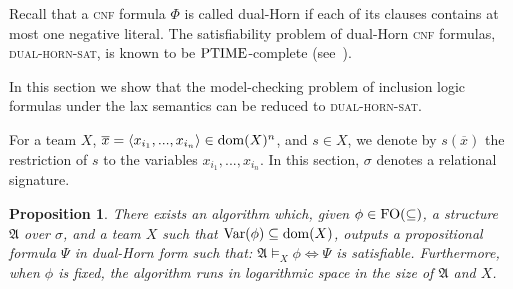 \documentclass{article}
\theoremstyle{plain}
\newtheorem{proposition}[theorem]{Proposition}
\theoremstyle{definition}
\newcommand{\sg}{\sigma}
\newcommand{\mA}{{\mathfrak A}}
\newcommand{\dom}{{\rm dom}}
\newcommand{\restrict}[2]{{#1}({#2})}
\newcommand{\Var}{{\rm Var}}
\newcommand{\FOinclusion}{{\rm FO(\subseteq)}}
\newcommand{\Ptime}{{\rm PTIME}}
\newcommand{\tu}[1]{\overline{#1}}
\newcommand{\pb}[1]{\textsc{#1}}
\begin{document}
Recall that a \pb{cnf} formula $\Phi$ is called dual-Horn if each of its clauses contains at most one negative literal. The satisfiability problem of dual-Horn \pb{cnf} formulas, \pb{dual-horn-sat}, is known to be $\Ptime$-complete (see~\cite{GareyJ1979}).  

 In this section we show that the model-checking problem of inclusion logic formulas under the lax semantics  can be reduced to \pb{dual-horn-sat}.
  
For a team $X$, $\tu x= \langle x_{i_1},...,x_{i_n}\rangle \in \dom(X)^n$, and $s\in X$, we denote by $\restrict{s}{\tu x}$ the restriction of $s$ to the  variables $x_{i_1},...,x_{i_n}$. In this section, $\sg$ denotes a relational signature.

  \begin{proposition}\label{FO inclusion lax}
  There exists an algorithm which, given 
   $\phi\in\FOinclusion$,  a structure $\mA$ over $\sigma$, and  a team $X$ such that $\Var({\phi})\subseteq \dom(X)$, outputs a propositional formula $\Psi$ in dual-Horn form such that: $\mA \models_X \phi \iff  \Psi$ is satisfiable.
Furthermore, when $\phi$ is fixed, the algorithm runs in logarithmic space in the size of $\mA$ and $X$.
  \end{proposition}
  
\end{document}

